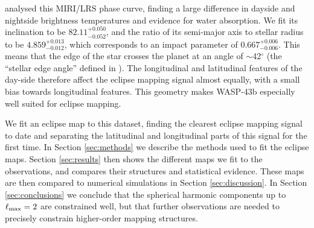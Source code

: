 \documentclass[twocolumn]{aastex631}
\begin{document}
\citet{bell2023wasp43b} analysed this MIRI/LRS phase curve, finding a large difference in dayside and nightside brightness temperatures and evidence for water absorption. We fit its inclination to be $82.11 ^{+ 0.050 } _{-0.052}$, and the ratio of its semi-major axis to stellar radius to be $4.859^{+0.013}_{-0.012}$, which corresponds to an impact parameter of $0.667^{+0.006}_{-0.006}$. This means that the edge of the star crosses the planet at an angle of $\sim$42$^{\circ}$ (the ``stellar edge angle'' defined in \cite{boone2023analytic}). The longitudinal and latitudinal features of the day-side therefore affect the eclipse mapping signal almost equally, with a small bias towards longitudinal features. This geometry makes WASP-43b especially well suited for eclipse mapping.

We fit an eclipse map to this dataset, finding the clearest eclipse mapping signal to date and separating the latitudinal and longitudinal parts of this signal for the first time. In Section \ref{sec:methods} we describe the methods used to fit the eclipse maps. Section \ref{sec:results} then shows the different maps we fit to the observations, and compares their structures and statistical evidence. These maps are then compared to numerical simulations in Section \ref{sec:discussion}. In Section \ref{sec:conclusions} we conclude that the spherical harmonic components up to $\ell_{\rm max}=2$ are constrained well, but that further observations are needed to precisely constrain higher-order mapping structures.
\end{document}
